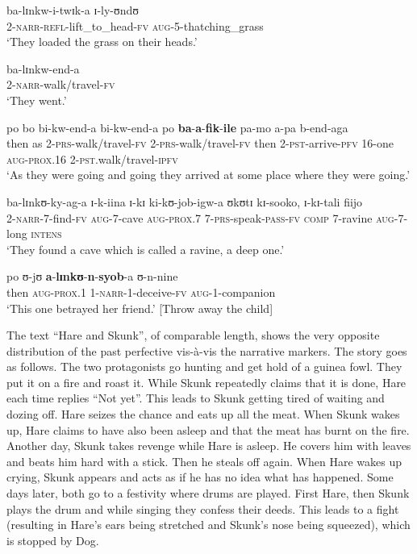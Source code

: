 \begin{exe}
	\ex \label{exThrowAwayTheChildPstPfv}
	\begin{xlist}
		\ex \gll ba-lɪnkw-i-twɪk-a ɪ-ly-ʊndʊ\\
		2-\textsc{narr}-\textsc{refl}-lift\_to\_head-\textsc{fv} \textsc{aug}-5-thatching\_grass\\
		\glt \lq They loaded the grass on their heads.'
		
		\ex \gll ba-lɪnkw-end-a\\
		2-\textsc{narr}-walk/travel-\textsc{fv}\\
		\glt \lq They went.'
		
		\ex \label{exThrowAwayTheChildPstPfvSentence3}
		\gll po bo bi-kw-end-a bi-kw-end-a po \textbf{ba}-\textbf{a}-\textbf{fik}-\textbf{ile} pa-mo a-pa b-end-aga\\
		then as 2-\textsc{prs}-walk/travel-\textsc{fv} 2-\textsc{prs}-walk/travel-\textsc{fv} then 2-\textsc{pst}-arrive-\textsc{pfv} 16-one \textsc{aug}-\textsc{prox.16} 2-\textsc{pst}.walk/travel-\textsc{ipfv}\\
		\glt \lq As they were going and going they arrived at some place where they were going.'
		
		\ex\gll ba-lɪnkʊ-ky-ag-a ɪ-k-iina ɪ-kɪ ki-kʊ-job-igw-a ʊkʊtɪ kɪ-sooko, ɪ-kɪ-tali fiijo\\
		2-\textsc{narr}-7-find-\textsc{fv} \textsc{aug}-7-cave \textsc{aug}-\textsc{prox.7} 7-\textsc{prs}-speak-\textsc{pass}-\textsc{fv} \textsc{comp} 7-ravine \textsc{aug}-7-long \textsc{intens}\\
		\glt \lq They found a cave which is called a ravine, a deep one.'
		
		\ex \gll po ʊ-jʊ \textbf{a}-\textbf{lɪnkʊ}-\textbf{n}-\textbf{syob}-a ʊ-n-nine\\
		then \textsc{aug}-\textsc{prox.1} 1-\textsc{narr}-1-deceive-\textsc{fv} \textsc{aug}-1-companion\\
		\glt \lq This one betrayed her friend.' [Throw away the child]
	\end{xlist}
\end{exe}

The text ``Hare and Skunk'', of comparable length, shows the very opposite distribution of the past perfective vis-à-vis the narrative markers. The story goes as follows. The two protagonists go hunting and get hold of a guinea fowl. They put it on a fire and roast it. While Skunk repeatedly claims that it is done, Hare each time replies ``Not yet''. This leads to Skunk getting tired of waiting and dozing off. Hare seizes the chance and eats up all the meat. When Skunk wakes up, Hare claims to have also been asleep and that the meat has burnt on the fire. Another day, Skunk takes revenge while Hare is asleep. He covers him with leaves and beats him hard with a stick. Then he steals off again. When Hare wakes up crying, Skunk appears and acts as if he has no idea what has happened. Some days later, both go to a festivity where drums are played. First Hare, then Skunk plays the drum and while singing they confess their deeds. This leads to a fight (resulting in Hare's ears being stretched and Skunk's nose being squeezed), which is stopped by Dog.

